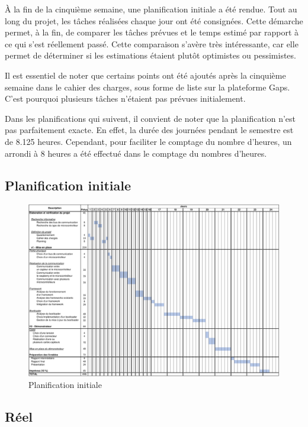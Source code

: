 À la fin de la cinquième semaine, une planification initiale a été rendue.
Tout au long du projet, les tâches réalisées chaque jour ont été consignées. Cette démarche permet, à la fin, de comparer les tâches prévues et le temps estimé par rapport à ce qui s'est réellement passé.
Cette comparaison s'avère très intéressante, car elle permet de déterminer si les estimations étaient plutôt optimistes ou pessimistes.

Il est essentiel de noter que certains points ont été ajoutés après la cinquième semaine dans le cahier des charges, sous forme de liste sur la plateforme Gaps.
C'est pourquoi plusieurs tâches n'étaient pas prévues initialement.

Dans les planifications qui suivent, il convient de noter que la planification n'est pas parfaitement exacte.
En effet, la durée des journées pendant le semestre est de 8.125 heures.
Cependant, pour faciliter le comptage du nombre d'heures, un arrondi à 8 heures a été effectué dans le comptage du nombres d'heures.

\newpage
\subsection{Planification initiale}

\begin{figure}[H]
    \centering
    \includegraphics[angle=90,origin=c,scale=0.55]{./assets/files/planning_initial.pdf}
    \caption{Planification initiale}
\end{figure}

\newpage
\subsection{Réel}

